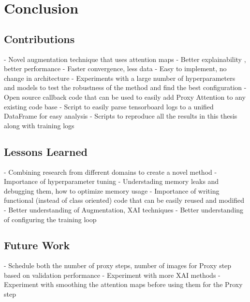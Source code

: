 \chapter{Conclusion}
\section{Contributions}
- Novel augmentation technique that uses attention maps
    - Better explainability , better performance
    - Faster convergence, less data
    - Easy to implement, no change in architecture
- Experiments with a large number of hyperparameters and models to test the robustness of the method and find the best configuration
- Open source callback code that can be used to easily add Proxy Attention to any existing code base
- Script to easily parse tensorboard logs to a unified DataFrame for easy analysis
- Scripts to reproduce all the results in this thesis along with training logs

\section{Lessons Learned}
- Combining research from different domains to create a novel method
- Importance of hyperparameter tuning
- Understading memory leaks and debugging them, how to optimize memory usage 
- Importance of writing functional (instead of class oriented) code that can be easily reused and modified 
- Better understanding of Augmentation, XAI techniques
- Better understanding of configuring the training loop

\section{Future Work}
- Schedule both the number of proxy steps, number of images for Proxy step based on validation performance
- Experiment with more XAI methods
- Experiment with smoothing the attention maps before using them for the Proxy step
